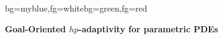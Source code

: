 {
\begin{frame}[plain]
\begin{variableblock}{}{bg=myblue,fg=white}{bg=green,fg=red}
\begin{center}
\textbf{Goal-Oriented $hp$-adaptivity for parametric PDEs}
\end{center}
\end{variableblock}
\end{frame}
}